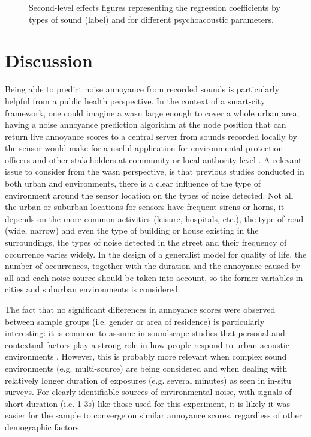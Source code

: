 \begin{figure}
  \label{fig:annoyance-effects}
  \centering
  \caption{Second-level effects figures representing the regression coefficients by types of sound (label) and for different psychoacoustic parameters.}
\end{figure}


\section{Discussion}

Being able to predict noise annoyance from recorded sounds is particularly helpful from a public health perspective. In the context of a smart-city framework, one could imagine a \gls{wasn} large enough to cover a whole urban area; having a noise annoyance prediction algorithm at the node position that can return live annoyance scores to a central server from sounds recorded locally by the sensor would make for a useful application for environmental protection officers and other stakeholders at community or local authority level . A relevant issue to consider from the \gls{wasn} perspective, is that previous studies conducted in both urban  and  environments, there is a clear influence of the type of environment around the sensor location on the types of noise detected. Not all the urban or suburban locations for sensors have frequent sirens or horns, it depends on the more common activities (leisure, hospitals, etc.), the type of road (wide, narrow) and even the type of building or house existing in the surroundings, the types of noise detected in the street and their frequency of occurrence varies widely. In the design of a generalist model for quality of life, the number of occurrences, together with the duration and the annoyance caused by all and each noise source should be taken into account, so the former variables in cities and suburban environments is considered.

The fact that no significant differences in annoyance scores were observed between sample groups (i.e. gender or area of residence) is particularly interesting: it is common to assume in soundscape studies that personal and contextual factors play a strong role in how people respond to urban acoustic environments . However, this is probably more relevant when complex sound environments (e.g. multi-source) are being considered and when dealing with relatively longer duration of exposures (e.g. several minutes) as seen in in-situ surveys. For clearly identifiable sources of environmental noise, with signals of short duration (i.e. 1-3s) like those used for this experiment, it is likely it was easier for the sample to converge on similar annoyance scores, regardless of other demographic factors.

